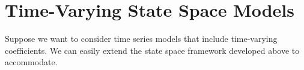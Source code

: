 \documentclass[a4paper,12pt]{article}
\begin{document}
\clearpage
\section{Time-Varying State Space Models}

Suppose we want to consider time series models that
include time-varying coefficients. We can easily extend
the state space framework developed above to accommodate.




%
\end{document}
